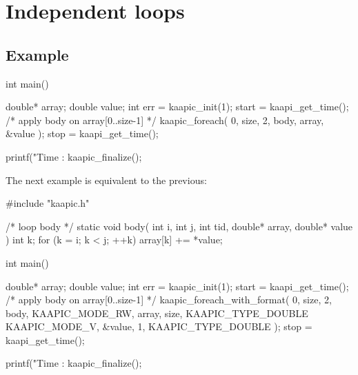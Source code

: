 \documentclass[a4paper, 11pt]{article}
\makeatletter
\newenvironment{apisection}[2][noshortnameprovided]{%
  \newpage
  \section{#2}
  \label{api@#1}
  \newcommand{\api@newpart}[4][noshortpartnameprovided]{%
    \newenvironment{##1}{%
      \subsection{##2}%
      \label{api@#1@##1}%
      ##3%
    }{##4}%
  }%
  \api@newpart[synopsis]{Synopsis}{}{}%
  \api@newpart[desc]{Description}{}{}%
  \api@newpart[params]{Parameters}{%
    \let\api@indesc\@empty
    \newcommand{\param}[1]{%
      \def\api@indesc{yes}%
      \begin{description}%
        \renewcommand{\param}[1]{\item[########1]}%
      \item[####1]
      }%
      \newenvironment{parameters}{%
        \begin{description}%
          \renewcommand{\param}[1]{\item[########1]}%
        }{%
        \end{description}%
      }
    }{%
      \ifx\api@indesc\@empty\relax\else%
    \end{description}%
    \fi%
  }%
  \api@newpart[ret]{Return value}{%
    \newcommand{\otherret}{\par\medskip\noindent}%
  }{}%
  \api@newpart[example]{Example}{}{}%
}{}
\makeatother
\begin{document}
\begin{apisection}[loop]{Independent loops}
\begin{example}
\begin{code}
  int main()
  {
    double* array;
    double value;
    int err = kaapic_init(1);
    start = kaapi_get_time(); 
    /* apply body on array[0..size-1] */
    kaapic_foreach( 0, size, 2, body, array, &value );
    stop = kaapi_get_time(); 

    printf("Time : %
    kaapic_finalize();
  }
    \end{code}

    The next example is equivalent to the previous:
    \begin{code}
  #include "kaapic.h"

  /* loop body */
  static void body(
    int i, int j, int tid, double* array, double* value
  ) 
  {
    int k;
    for (k = i; k < j; ++k)
      array[k] += *value;
  }

  int main()
  {
    double* array;
    double value;
    int err = kaapic_init(1);
    start = kaapi_get_time(); 
    /* apply body on array[0..size-1] */
    kaapic_foreach_with_format( 0, size, 2, body, 
        KAAPIC_MODE_RW, array, size, KAAPIC_TYPE_DOUBLE
        KAAPIC_MODE_V, &value, 1,  KAAPIC_TYPE_DOUBLE
    );
    stop = kaapi_get_time(); 

    printf("Time : %
    kaapic_finalize();
  }
    \end{code}
  \end{example}
\end{apisection}
\end{document}
